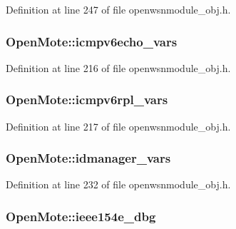 Definition at line 247 of file openwsnmodule\+\_\+obj.\+h.

\subsubsection[{\texorpdfstring{icmpv6echo\+\_\+vars}{icmpv6echo_vars}}]{ Open\+Mote\+::icmpv6echo\+\_\+vars}\hypertarget{struct_open_mote_a74d216986865202f5926575d3242d295}{}\label{struct_open_mote_a74d216986865202f5926575d3242d295}


Definition at line 216 of file openwsnmodule\+\_\+obj.\+h.

\subsubsection[{\texorpdfstring{icmpv6rpl\+\_\+vars}{icmpv6rpl_vars}}]{ Open\+Mote\+::icmpv6rpl\+\_\+vars}\hypertarget{struct_open_mote_a01fe7b57f57b11c5fa7023c87949d81d}{}\label{struct_open_mote_a01fe7b57f57b11c5fa7023c87949d81d}


Definition at line 217 of file openwsnmodule\+\_\+obj.\+h.

\subsubsection[{\texorpdfstring{idmanager\+\_\+vars}{idmanager_vars}}]{ Open\+Mote\+::idmanager\+\_\+vars}\hypertarget{struct_open_mote_aee86d15881d8b0681a1f0c292536888c}{}\label{struct_open_mote_aee86d15881d8b0681a1f0c292536888c}


Definition at line 232 of file openwsnmodule\+\_\+obj.\+h.

\subsubsection[{\texorpdfstring{ieee154e\+\_\+dbg}{ieee154e_dbg}}]{ Open\+Mote\+::ieee154e\+\_\+dbg}\hypertarget{struct_open_mote_a31e50da96e526495ff1c49873ae60ea9}{}\label{struct_open_mote_a31e50da96e526495ff1c49873ae60ea9}


